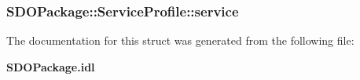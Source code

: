 \subsubsection[{service}]{ {\bf SDOPackage::ServiceProfile::service}}\label{structSDOPackage_1_1ServiceProfile_a603c6ea80a4a86c0dc1dad9f20d96efb}


The documentation for this struct was generated from the following file:\begin{DoxyCompactItemize}
\item 
{\bf SDOPackage.idl}\end{DoxyCompactItemize}
